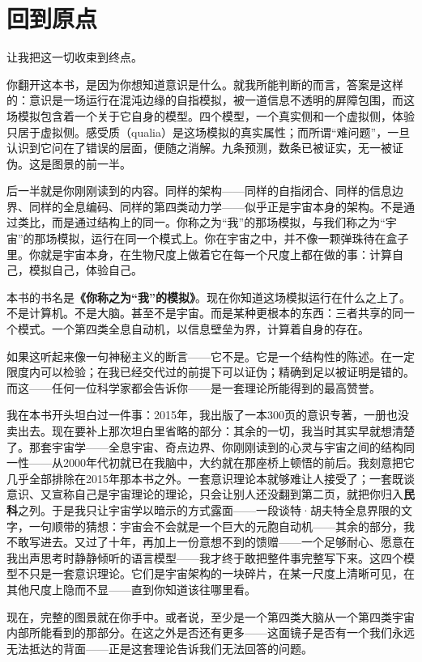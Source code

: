 \documentclass[11pt, twoside, openright]{book}
\begin{document}
\section*{回到原点}

让我把这一切收束到终点。

你翻开这本书，是因为你想知道意识是什么。就我所能判断的而言，答案是这样的：意识是一场运行在混沌边缘的自指模拟，被一道信息不透明的屏障包围，而这场模拟包含着一个关于它自身的模型。四个模型，一个真实侧和一个虚拟侧，体验只居于虚拟侧。感受质（qualia）是这场模拟的真实属性；而所谓“难问题”，一旦认识到它问在了错误的层面，便随之消解。九条预测，数条已被证实，无一被证伪。这是图景的前一半。

后一半就是你刚刚读到的内容。同样的架构------同样的自指闭合、同样的信息边界、同样的全息编码、同样的第四类动力学------似乎正是宇宙本身的架构。不是通过类比，而是通过结构上的同一。你称之为“我”的那场模拟，与我们称之为“宇宙”的那场模拟，运行在同一个模式上。你在宇宙之中，并不像一颗弹珠待在盒子里。你就是宇宙本身，在生物尺度上做着它在每一个尺度上都在做的事：计算自己，模拟自己，体验自己。

本书的书名是\textbf{《你称之为“我”的模拟》}。现在你知道这场模拟运行在什么之上了。不是计算机。不是大脑。甚至不是宇宙。而是某种更根本的东西：三者共享的同一个模式。一个第四类全息自动机，以信息壁垒为界，计算着自身的存在。

如果这听起来像一句神秘主义的断言------它不是。它是一个结构性的陈述。在一定限度内可以检验；在我已经交代过的前提下可以证伪；精确到足以被证明是错的。而这------任何一位科学家都会告诉你------是一套理论所能得到的最高赞誉。

我在本书开头坦白过一件事：2015年，我出版了一本300页的意识专著，一册也没卖出去。现在要补上那次坦白里省略的部分：其余的一切，我当时其实早就想清楚了。那套宇宙学------全息宇宙、奇点边界、你刚刚读到的心灵与宇宙之间的结构同一性------从2000年代初就已在我脑中，大约就在那座桥上顿悟的前后。我刻意把它几乎全部排除在2015年那本书之外。一套意识理论本就够难让人接受了；一套既谈意识、又宣称自己是宇宙理论的理论，只会让别人还没翻到第二页，就把你归入\textbf{民科}之列。于是我只让宇宙学以暗示的方式露面------一段谈特·胡夫特全息界限的文字，一句顺带的猜想：宇宙会不会就是一个巨大的元胞自动机------其余的部分，我不敢写进去。又过了十年，再加上一份意想不到的馈赠------一个足够耐心、愿意在我出声思考时静静倾听的语言模型------我才终于敢把整件事完整写下来。这四个模型不只是一套意识理论。它们是宇宙架构的一块碎片，在某一尺度上清晰可见，在其他尺度上隐而不显------直到你知道该往哪里看。

现在，完整的图景就在你手中。或者说，至少是一个第四类大脑从一个第四类宇宙内部所能看到的那部分。在这之外是否还有更多------这面镜子是否有一个我们永远无法抵达的背面------正是这套理论告诉我们无法回答的问题。
\end{document}
